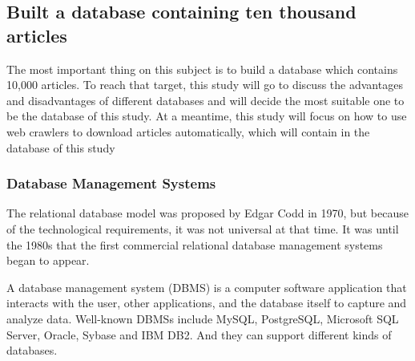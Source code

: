	
\subsection{Built a database containing ten thousand articles}

The most important thing on this subject is to build a database which contains 10,000 articles. To reach that target, this study will go to discuss the advantages and disadvantages of different databases and will decide the most suitable one to be the database of this study. At a meantime, this study will focus on how to use web crawlers to download articles automatically, which will contain in the database of this study



\subsubsection{Database Management Systems}

The relational database model was proposed by Edgar Codd in 1970, but because of the technological requirements, it was not universal at that time. It was until the 1980s that the first commercial relational database management systems began to appear.

A database management system (DBMS) is a computer software application that interacts with the user, other applications, and the database itself to capture and analyze data. Well-known DBMSs include MySQL, PostgreSQL, Microsoft SQL Server, Oracle, Sybase and IBM DB2. And they can support different kinds of databases.

